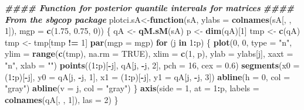 \documentclass[12pt]{article}
\newenvironment{Shaded}{\begin{snugshade}}{\end{snugshade}}
\newcommand{\AttributeTok}[1]{\textcolor[rgb]{0.13,0.29,0.53}{#1}}
\newcommand{\ConstantTok}[1]{\textcolor[rgb]{0.56,0.35,0.01}{#1}}
\newcommand{\ControlFlowTok}[1]{\textcolor[rgb]{0.13,0.29,0.53}{\textbf{#1}}}
\newcommand{\DecValTok}[1]{\textcolor[rgb]{0.00,0.00,0.81}{#1}}
\newcommand{\DocumentationTok}[1]{\textcolor[rgb]{0.56,0.35,0.01}{\textbf{\textit{#1}}}}
\newcommand{\FloatTok}[1]{\textcolor[rgb]{0.00,0.00,0.81}{#1}}
\newcommand{\FunctionTok}[1]{\textcolor[rgb]{0.13,0.29,0.53}{\textbf{#1}}}
\newcommand{\NormalTok}[1]{#1}
\newcommand{\OtherTok}[1]{\textcolor[rgb]{0.56,0.35,0.01}{#1}}
\newcommand{\SpecialCharTok}[1]{\textcolor[rgb]{0.81,0.36,0.00}{\textbf{#1}}}
\newcommand{\StringTok}[1]{\textcolor[rgb]{0.31,0.60,0.02}{#1}}
\begin{document}
\begin{Shaded}
\begin{Highlighting}[]
\DocumentationTok{\#\#\#\# Function for posterior quantile intervals for matrices}
\DocumentationTok{\#\#\#\# From the \textasciigrave{}sbgcop\textasciigrave{} package}
\NormalTok{plotci.sA}\OtherTok{\textless{}{-}}\ControlFlowTok{function}\NormalTok{(sA, }\AttributeTok{ylabs =} \FunctionTok{colnames}\NormalTok{(sA[, , }\DecValTok{1}\NormalTok{]), }\AttributeTok{mgp =} \FunctionTok{c}\NormalTok{(}\FloatTok{1.75}\NormalTok{, }\FloatTok{0.75}\NormalTok{, }
    \DecValTok{0}\NormalTok{)) }
\NormalTok{\{}
\NormalTok{    qA }\OtherTok{\textless{}{-}} \FunctionTok{qM.sM}\NormalTok{(sA)}
\NormalTok{    p }\OtherTok{\textless{}{-}} \FunctionTok{dim}\NormalTok{(qA)[}\DecValTok{1}\NormalTok{]}
\NormalTok{    tmp }\OtherTok{\textless{}{-}} \FunctionTok{c}\NormalTok{(qA)}
\NormalTok{    tmp }\OtherTok{\textless{}{-}}\NormalTok{ tmp[tmp }\SpecialCharTok{!=} \DecValTok{1}\NormalTok{]}
    \FunctionTok{par}\NormalTok{(}\AttributeTok{mgp =}\NormalTok{ mgp)}
    \ControlFlowTok{for}\NormalTok{ (j }\ControlFlowTok{in} \DecValTok{1}\SpecialCharTok{:}\NormalTok{p) \{}
        \FunctionTok{plot}\NormalTok{(}\DecValTok{0}\NormalTok{, }\DecValTok{0}\NormalTok{, }\AttributeTok{type =} \StringTok{"n"}\NormalTok{, }\AttributeTok{ylim =} \FunctionTok{range}\NormalTok{(}\FunctionTok{c}\NormalTok{(tmp), }\AttributeTok{na.rm =} \ConstantTok{TRUE}\NormalTok{), }
            \AttributeTok{xlim =} \FunctionTok{c}\NormalTok{(}\DecValTok{1}\NormalTok{, p), }\AttributeTok{ylab =}\NormalTok{ ylabs[j], }\AttributeTok{xaxt =} \StringTok{"n"}\NormalTok{, }\AttributeTok{xlab =} \StringTok{""}\NormalTok{)}
        \FunctionTok{points}\NormalTok{((}\DecValTok{1}\SpecialCharTok{:}\NormalTok{p)[}\SpecialCharTok{{-}}\NormalTok{j], qA[j, }\SpecialCharTok{{-}}\NormalTok{j, }\DecValTok{2}\NormalTok{], }\AttributeTok{pch =} \DecValTok{16}\NormalTok{, }\AttributeTok{cex =} \FloatTok{0.6}\NormalTok{)}
        \FunctionTok{segments}\NormalTok{(}\AttributeTok{x0 =}\NormalTok{ (}\DecValTok{1}\SpecialCharTok{:}\NormalTok{p)[}\SpecialCharTok{{-}}\NormalTok{j], }\AttributeTok{y0 =}\NormalTok{ qA[j, }\SpecialCharTok{{-}}\NormalTok{j, }\DecValTok{1}\NormalTok{], }\AttributeTok{x1 =}\NormalTok{ (}\DecValTok{1}\SpecialCharTok{:}\NormalTok{p)[}\SpecialCharTok{{-}}\NormalTok{j], }
            \AttributeTok{y1 =}\NormalTok{ qA[j, }\SpecialCharTok{{-}}\NormalTok{j, }\DecValTok{3}\NormalTok{])}
        \FunctionTok{abline}\NormalTok{(}\AttributeTok{h =} \DecValTok{0}\NormalTok{, }\AttributeTok{col =} \StringTok{"gray"}\NormalTok{)}
        \FunctionTok{abline}\NormalTok{(}\AttributeTok{v =}\NormalTok{ j, }\AttributeTok{col =} \StringTok{"gray"}\NormalTok{)}
\NormalTok{    \}}
    \FunctionTok{axis}\NormalTok{(}\AttributeTok{side =} \DecValTok{1}\NormalTok{, }\AttributeTok{at =} \DecValTok{1}\SpecialCharTok{:}\NormalTok{p, }\AttributeTok{labels =} \FunctionTok{colnames}\NormalTok{(qA[, , }\DecValTok{1}\NormalTok{]), }\AttributeTok{las =} \DecValTok{2}\NormalTok{)}
\NormalTok{\}}


\end{Highlighting}
\end{Shaded}
\end{document}
